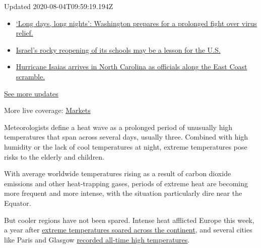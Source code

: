 Updated 2020-08-04T09:59:19.194Z

\begin{itemize}
\tightlist
\item
  \href{https://www.nytimes.com/2020/08/04/world/coronavirus-covid-19.html?action=click\&pgtype=Article\&state=default\&region=MAIN_CONTENT_1\&context=storylines_live_updates\#link-6b644638}{`Long
  days, long nights': Washington prepares for a prolonged fight over
  virus relief.}
\item
  \href{https://www.nytimes.com/2020/08/04/world/coronavirus-covid-19.html?action=click\&pgtype=Article\&state=default\&region=MAIN_CONTENT_1\&context=storylines_live_updates\#link-7af9fca0}{Israel's
  rocky reopening of its schools may be a lesson for the U.S.}
\item
  \href{https://www.nytimes.com/2020/08/04/world/coronavirus-covid-19.html?action=click\&pgtype=Article\&state=default\&region=MAIN_CONTENT_1\&context=storylines_live_updates\#link-33bf9168}{Hurricane
  Isaias arrives in North Carolina as officials along the East Coast
  scramble.}
\end{itemize}

\href{https://www.nytimes.com/2020/08/04/world/coronavirus-covid-19.html?action=click\&pgtype=Article\&state=default\&region=MAIN_CONTENT_1\&context=storylines_live_updates}{See
more updates}

More live coverage:
\href{https://www.nytimes.com/live/2020/08/03/business/stock-market-today-coronavirus?action=click\&pgtype=Article\&state=default\&region=MAIN_CONTENT_1\&context=storylines_live_updates}{Markets}

Meteorologists define a heat wave as a prolonged period of unusually
high temperatures that span across several days, usually three. Combined
with high humidity or the lack of cool temperatures at night, extreme
temperatures pose risks to the elderly and children.

With average worldwide temperatures rising as a result of carbon dioxide
emissions and other heat-trapping gases, periods of extreme heat are
becoming more frequent and more intense, with the situation particularly
dire near the Equator.

But cooler regions have not been spared. Intense heat afflicted Europe
this week, a year after
\href{https://www.nytimes.com/2019/06/26/world/europe/europe-heat-wave.html}{extreme
temperatures soared across the continent}, and several cities like Paris
and Glasgow
\href{https://www.nytimes.com/2019/07/25/world/europe/heatwave-record-temperatures.html}{recorded
all-time high temperatures}.

